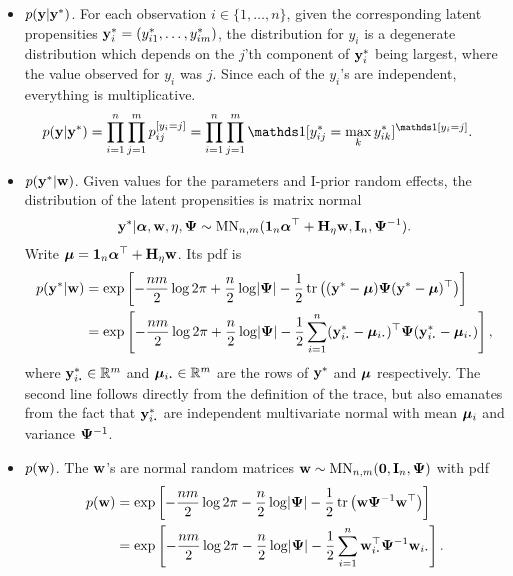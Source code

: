 \begin{itemize}
  \item {\boldmath$p({\mathbf y}|{\mathbf y}^*)$}. For each observation $i\in\{1,\dots,n\}$, given the corresponding latent propensities ${\mathbf y}^*_i = (y_{i1}^*,\dots,y_{im}^*)$, the distribution for $y_i$ is a degenerate distribution which depends on the $j$'th component of ${\mathbf y}^*_i$ being largest, where the value observed for $y_i$ was $j$. Since each of the $y_i$'s are independent, everything is multiplicative.
  \begin{align*}
    p(\by|\by^*) 
    &= \prod_{i=1}^n \prod_{j=1}^m p_{ij}^{[y_i = j]} 
    = \prod_{i=1}^n \prod_{j=1}^m \ind[y_{ij}^* 
    = \max_k y_{ik}^*]^{\ind[y_i = j]}.
  \end{align*}
  
  \item {\boldmath$p({\mathbf y}^*|{\mathbf w})$}. Given values for the parameters and I-prior random effects, the distribution of the latent propensities is matrix normal
  \[
    {\mathbf y}^*|{\bm\alpha},{\mathbf w},\eta,{\bm\Psi} \sim \operatorname{MN}_{n,m}({\mathbf 1}_n{\bm\alpha}^\top + {\mathbf H}_\eta{\mathbf w}, {\mathbf I}_n, {\bm\Psi}^{-1}).
  \]
  Write ${\bm\mu} = {\mathbf 1}_n{\bm\alpha}^\top + {\mathbf H}_\eta{\mathbf w}$.
  Its pdf is
  \begin{align*}
    p(\by^*|\bw)
    &= \exp \left[-\half[nm]\log 2\pi + \half[n]\log\abs{\bPsi} - \half\tr \big((\by^* - \bmu) \bPsi (\by^* - \bmu)^\top  \big)  \right] \\
    &= \exp \left[-\half[nm]\log 2\pi + \half[n]\log\abs{\bPsi} - \half\sum_{i=1}^n (\by^*_{i \bigcdot} - \bmu_{i \bigcdot})^\top \bPsi (\by^*_{i \bigcdot} - \bmu_{i \bigcdot})   \right],
  \end{align*}
  where $\by^*_{i \bigcdot} \in\bbR^m$ and $\bmu_{i \bigcdot} \in\bbR^m$ are the rows of ${\mathbf y}^*$ and ${\bm\mu}$ respectively.
  The second line follows directly from the definition of the trace, but also emanates from the fact that $\by_{i \bigcdot}^*$ are independent multivariate normal with mean ${\bm\mu}_i$ and variance ${\bm\Psi}^{-1}$.
  
  \item {\boldmath$p({\mathbf w})$}. The ${\mathbf w}$'s are normal random matrices ${\mathbf w} \sim \operatorname{MN}_{n,m}({\mathbf 0}, {\mathbf I}_n,{\bm\Psi})$ with pdf
  \begin{align*}
    p(\bw) 
    &= \exp \left[-\half[nm]\log 2\pi - \half[n]\log\abs{\bPsi} - \half\tr \big( \bw \bPsi^{-1} \bw^\top \big)  \right] \\
    &= \exp \left[-\half[nm]\log 2\pi - \half[n]\log\abs{\bPsi} - \half\sum_{i=1}^n  \bw_{i \bigcdot}^\top \bPsi^{-1} \bw_{i \bigcdot}   \right].
  \end{align*}
\end{itemize}

